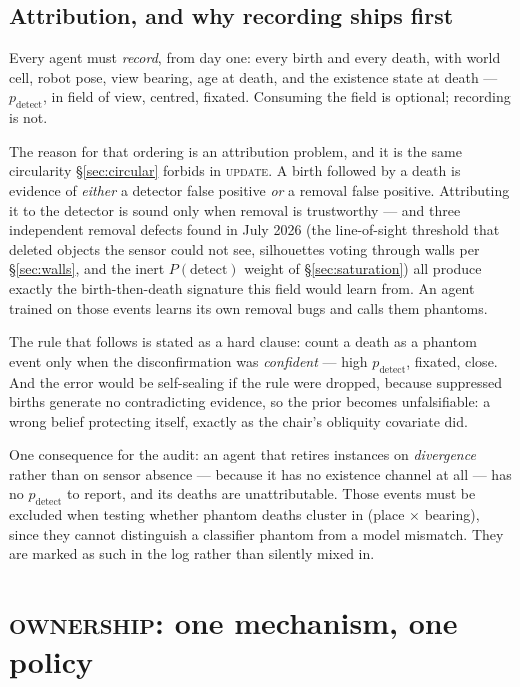 \documentclass[11pt,a4paper]{report}
\newcommand{\stage}[1]{\textsc{#1}}
\newcommand{\Update}{\stage{update}}
\newcommand{\Ownership}{\stage{ownership}}
\begin{document}
\subsection{Attribution, and why recording ships first}
\label{sec:attribution}

Every agent must \emph{record}, from day one: every birth and every death, with world cell, robot
pose, view bearing, age at death, and the existence state at death --- $p_{\text{detect}}$, in field
of view, centred, fixated. Consuming the field is optional; recording is not.

The reason for that ordering is an attribution problem, and it is the same circularity
\S\ref{sec:circular} forbids in \Update. A birth followed by a death is evidence of \emph{either} a
detector false positive \emph{or} a removal false positive. Attributing it to the detector is sound
only when removal is trustworthy --- and three independent removal defects found in July 2026
(the line-of-sight threshold that deleted objects the sensor could not see, silhouettes voting
through walls per \S\ref{sec:walls}, and the inert $P(\text{detect})$ weight of
\S\ref{sec:saturation}) all produce exactly the birth-then-death signature this field would learn
from. An agent trained on those events learns its own removal bugs and calls them phantoms.

The rule that follows is stated as a hard clause: count a death as a phantom event only when the
disconfirmation was \emph{confident} --- high $p_{\text{detect}}$, fixated, close. And the error
would be self-sealing if the rule were dropped, because suppressed births generate no contradicting
evidence, so the prior becomes unfalsifiable: a wrong belief protecting itself, exactly as the
chair's obliquity covariate did.

One consequence for the audit: an agent that retires instances on \emph{divergence} rather than on
sensor absence --- because it has no existence channel at all --- has no $p_{\text{detect}}$ to
report, and its deaths are unattributable. Those events must be excluded when testing whether phantom
deaths cluster in (place $\times$ bearing), since they cannot distinguish a classifier phantom from a
model mismatch. They are marked as such in the log rather than silently mixed in.

\section{\Ownership: one mechanism, one policy}
\label{sec:ownership}
\end{document}
